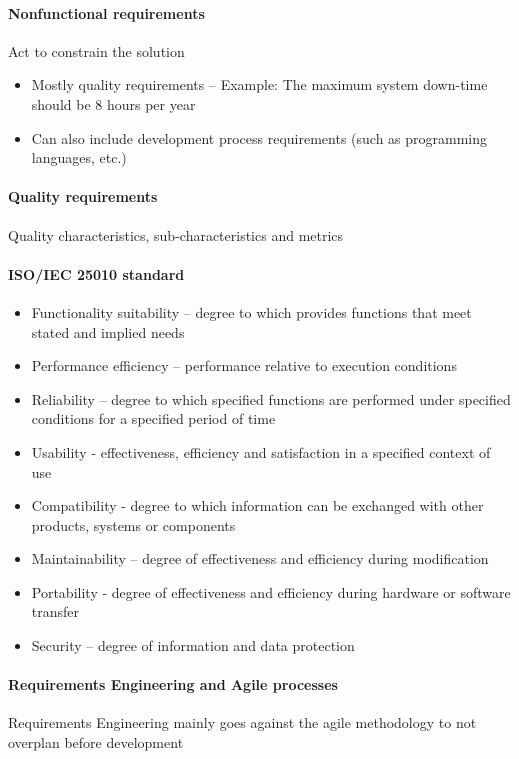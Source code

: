 \documentclass[../ESOF_notes.tex]{subfiles}
\begin{document}
\paragraph{Nonfunctional requirements} 
Act to constrain the solution
\begin{itemize}
    \item Mostly quality requirements – Example: The maximum system down-time should be 8 hours per year
    \item Can also include development process requirements (such as programming languages, etc.)
\end{itemize}

\paragraph{Quality requirements} 
Quality characteristics, sub-characteristics and metrics

\paragraph{ISO/IEC 25010 standard}
    \begin{itemize}
        \item Functionality suitability – degree to which provides functions that meet stated and implied needs
        \item Performance efficiency – performance relative to execution conditions
        \item Reliability – degree to which specified functions are performed under specified conditions for a specified period of time
        \item Usability - effectiveness, efficiency and satisfaction in a specified context of use
        \item Compatibility - degree to which information can be exchanged with other products, systems or components
        \item Maintainability – degree of effectiveness and efficiency during modification
        \item Portability - degree of effectiveness and efficiency during hardware or software transfer
        \item Security – degree of information and data protection
    \end{itemize}

\paragraph{Requirements Engineering and Agile processes}
Requirements Engineering mainly goes against the agile methodology to not overplan before development
\end{document}
